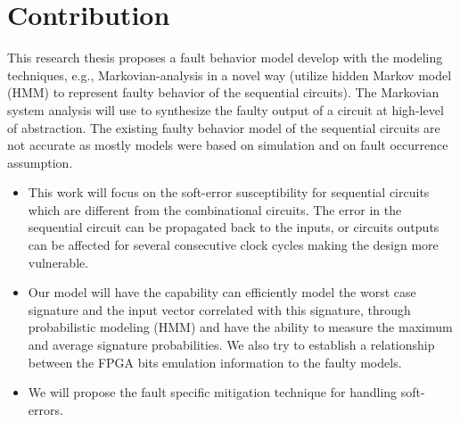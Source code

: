   

\section{Contribution}


This research thesis proposes a fault behavior model develop with the modeling techniques, e.g., Markovian-analysis in a novel way (utilize hidden Markov model (HMM) to represent faulty behavior of the sequential circuits). The Markovian system analysis will use to synthesize the faulty output of a circuit at high-level of abstraction. The existing faulty behavior model of the sequential circuits are not accurate as mostly models were based on simulation and on fault occurrence assumption.


\begin{itemize}


\item This work will focus on the soft-error susceptibility for sequential circuits which are different from the combinational circuits. The error in the sequential circuit can be propagated back to the inputs, or circuits outputs can be affected for several consecutive clock cycles making the design more vulnerable.  
\item Our model will have the capability can efficiently model the worst case signature and the input vector correlated with this signature, through probabilistic modeling (HMM) and have the ability to measure the maximum and average signature probabilities. We also try to establish a relationship between the FPGA bits emulation information to the faulty models.


\item We will propose the fault specific mitigation technique for handling soft-errors.
\end{itemize}




